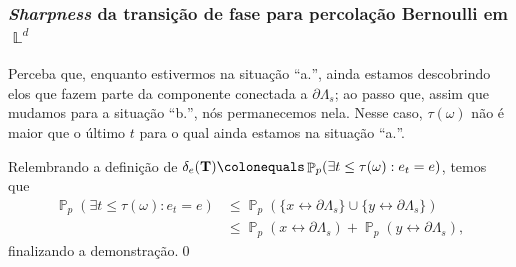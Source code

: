 \documentclass[9pt]{beamer}
\theoremstyle{definition} %
\DeclareMathOperator{\PX}{\mathbb{P}} %
\DeclareMathOperator{\LX}{\mathbb{L}} %
\begin{document}
	\begin{frame}[t]
	\frametitle{\textit{Sharpness} da transição de fase para percolação Bernoulli em $\LX^d$}
		Perceba que, enquanto estivermos na situação ``a$.$'', ainda estamos descobrindo elos que fazem parte da componente conectada a $\partial\Lambda_s$; ao passo que, assim que mudamos para a situação ``b$.$'', nós permanecemos nela. Nesse caso, $\tau(\omega)$ não é maior que o último $t$ para o qual ainda estamos na situação ``a$.$''.
		
		\par Relembrando a definição de $\delta_e(\text{\textbf{T}}) \colonequals \PX_p(\exists t \leq \tau(\omega) : e_t = e)$, temos que
		\begin{align*}
		\PX_p(\exists t \leq \tau(\omega) : e_t = e) &\leq \PX_p\left(\{x \leftrightarrow \partial\Lambda_s\} \cup \{y \leftrightarrow \partial\Lambda_s\}\right) \\
		&\leq \PX_p(x \leftrightarrow \partial\Lambda_s) + \PX_p(y \leftrightarrow \partial\Lambda_s),
		\end{align*}
		finalizando a demonstração.\hspace{\fill}\qed
	\end{frame}
\end{document}
